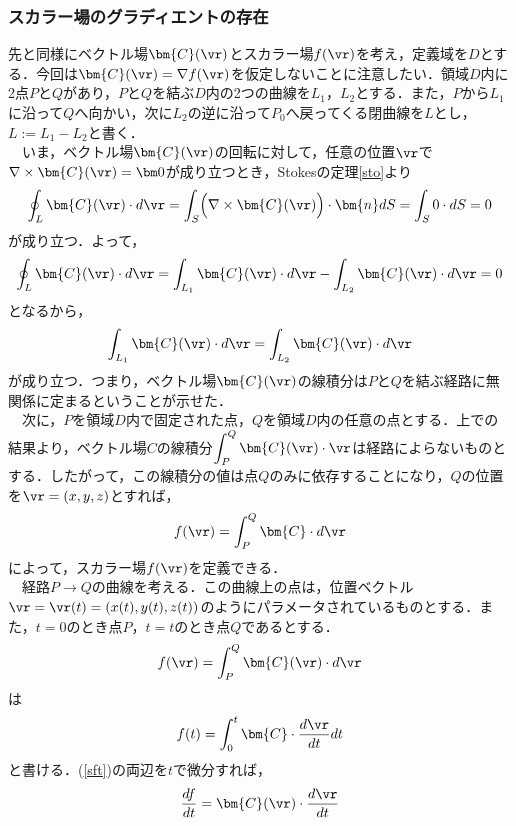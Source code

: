 %
\subsubsection{スカラー場のグラディエントの存在}
先と同様にベクトル場$\bm{C}(\vr)$とスカラー場$f(\vr)$を考え，定義域を$D$とする．今回は$\bm{C}(\vr)=\nabla f(\vr)$を仮定しないことに注意したい．領域$D$内に2点$P$と$Q$があり，$P$と$Q$を結ぶ$D$内の2つの曲線を$L_1$，$L_2$とする．また，$P$から$L_1$に沿って$Q$へ向かい，次に$L_2$の逆に沿って$P_0$へ戻ってくる閉曲線を$L$とし，$L:=L_1-L_2$と書く．\\
　いま，ベクトル場$\bm{C}(\vr)$の回転に対して，任意の位置$\vr$で$\nabla\times\bm{C}(\vr)=\bm0$が成り立つとき，Stokesの定理\ref{sto}より
\begin{align}
\oint_L\bm{C}(\vr)\cdot d\vr=\int_S\Bigl(\nabla\times\bm{C}(\vr)\Bigr)\cdot\bm{n}dS=\int_S0\cdot dS=0
\end{align}
が成り立つ．よって，
\begin{align}
\oint_L\bm{C}(\vr)\cdot d\vr=\int_{L_1}\bm{C}(\vr)\cdot d\vr-\int_{L_2}\bm{C}(\vr)\cdot d\vr=0
\end{align}
となるから，
\begin{align}
\int_{L_1}\bm{C}(\vr)\cdot d\vr=\int_{L_2}\bm{C}(\vr)\cdot d\vr
\end{align}
が成り立つ．つまり，ベクトル場$\bm{C}(\vr)$の線積分は$P$と$Q$を結ぶ経路に無関係に定まるということが示せた．\\
　次に，$P$を領域$D$内で固定された点，$Q$を領域$D$内の任意の点とする．上での結果より，ベクトル場$C$の線積分$\displaystyle\int_P^Q\bm{C}(\vr)\cdot\vr$は経路によらないものとする．したがって，この線積分の値は点$Q$のみに依存することになり，$Q$の位置を$\vr=(x,y,z)$とすれば，
\begin{align}\label{sf}
f(\vr)=\int_P^Q\bm{C}\cdot d\vr
\end{align}
によって，スカラー場$f(\vr)$を定義できる．\\
　経路$P\to Q$の曲線を考える．この曲線上の点は，位置ベクトル$\vr=\vr(t)=(x(t),y(t),z(t))$のようにパラメータされているものとする．また，$t=0$のとき点$P$，$t=t$のとき点$Q$であるとする．
\begin{align}
f(\vr)=\int_P^Q\bm{C}(\vr)\cdot d\vr
\end{align}
は
\begin{align}\label{sft}
f(t)=\int_0^t\bm{C}\cdot\frac{d\vr}{dt}dt
\end{align}
と書ける．(\ref{sft})の両辺を$t$で微分すれば，
\begin{align}\label{sft1}
\frac{df}{dt}=\bm{C}(\vr)\cdot\frac{d\vr}{dt}
\end{align}
